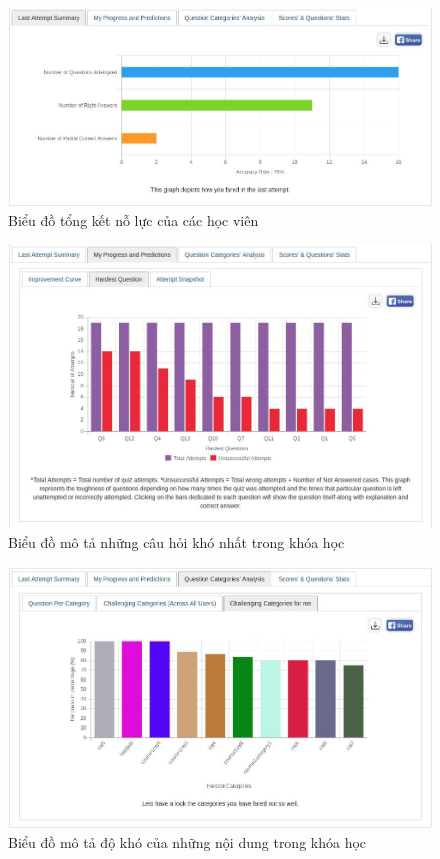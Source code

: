 \begin{center}
	\begin{figure}[htp]
		\begin{center}
			\includegraphics[width=0.8\linewidth]{img/47}
		\end{center}
		\caption{Biểu đồ tổng kết nỗ lực của các học viên}
		\label{refhinh85}
	\end{figure}
\end{center}

\begin{center}
	\begin{figure}[htp]
		\begin{center}
			\includegraphics[width=0.8\linewidth]{img/48}
		\end{center}
		\caption{Biểu đồ mô tả những câu hỏi khó nhất trong khóa học}
		\label{refhinh86}
	\end{figure}
\end{center}

\begin{center}
	\begin{figure}[htp]
		\begin{center}
			\includegraphics[width=0.8\linewidth]{img/49}
		\end{center}
		\caption{Biểu đồ mô tả độ khó của những nội dung trong khóa học}
		\label{refhinh87}
	\end{figure}
\end{center}

